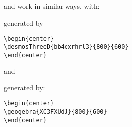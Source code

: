 \documentclass{ximera}
\begin{document}
 and
 work in similar ways,
with:
\begin{center}
\end{center}
generated by
\begin{verbatim}
\begin{center}
\desmosThreeD{bb4exrhrl3}{800}{600}
\end{center}
\end{verbatim}
and
\begin{center}
\end{center}
generated by:
\begin{verbatim}
\begin{center}
\geogebra{XC3FXUdJ}{800}{600}
\end{center}
\end{verbatim}
\end{document}
